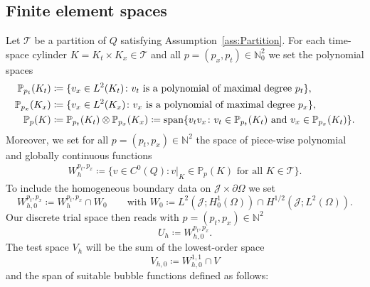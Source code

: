\documentclass{amsart}
\providecommand{\tria}{\mathcal{T}}
\newcommand{\cJ}{\mathcal J}
\begin{document}
\subsection{Finite element spaces}
Let $\tria$ be a partition of $Q$ satisfying Assumption~\ref{ass:Partition}.
For each time-space cylinder $K = K_t\times K_x\in \tria$ and all $p = (p_x,p_t)\in \mathbb{N}^2_0$ we set the polynomial spaces
\begin{align*}
\mathbb{P}_{p_t}(K_t) & \coloneqq \lbrace v_x \in L^2(K_t) \colon v_t \text{ is a polynomial of maximal degree }p_t\rbrace,\\
\mathbb{P}_{p_x}(K_x) & \coloneqq \lbrace v_x \in L^2(K_x) \colon v_x \text{ is a polynomial of maximal degree }p_x\rbrace,\\
\mathbb{P}_p(K) & \coloneqq \mathbb{P}_{p_t}(K_t) \otimes \mathbb{P}_{p_x}(K_x) \coloneqq \textup{span}\lbrace v_tv_x \colon v_t \in \mathbb{P}_{p_t}(K_t)\text{ and } v_x \in \mathbb{P}_{p_x}(K_t)\rbrace.
\end{align*}
Moreover, we set for all $p = (p_t,p_x)\in \mathbb{N}^2$ the space of piece-wise polynomial and globally continuous functions
\begin{align*}
W_h^{p_t,p_x} \coloneqq \lbrace v \in C^0(Q) \colon v|_K \in \mathbb{P}_p(K)\text{ for all }K\in \tria\rbrace.
\end{align*}
%
To include the homogeneous boundary data on $\mathcal{J} \times \partial \Omega$ we set 
\begin{equation}\label{eq:DefW_h0ptpx}
W_{h,0}^{p_t,p_x} \coloneqq W_h^{p_t,p_x} \cap W_0 \qquad\text{with } W_0 \coloneqq L^2(\mathcal{J} ;H^1_0(\Omega)) \cap H^{1/2}(\cJ;L^2(\Omega)).
\end{equation}
Our discrete trial space then reads with $p = (p_t,p_x) \in \mathbb{N}^2$
\begin{equation*}
U_h \coloneqq W_{h,0}^{p_t,p_x}.
\end{equation*}
%
The test space $V_h$ will be the sum of the lowest-order space 
\begin{equation*}
V_{h,0} \coloneqq W_{h,0}^{1,1} \cap V
\end{equation*}
and the span of suitable bubble functions defined as follows:
\end{document}
